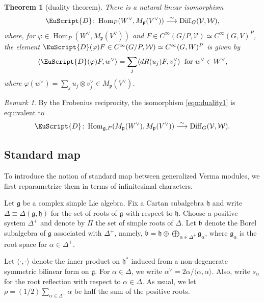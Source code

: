 \documentclass[reqno,11pt]{amsart}
\newtheorem{thm}[equation]{Theorem}
\theoremstyle{remark}
\newtheorem{rem}[equation]{Remark}
\numberwithin{equation}{section}
\newcommand{\ga}{\alpha}
\newcommand{\gD}{\Delta}
\newcommand{\fb}{{\mathfrak b}}
\newcommand{\fg}{{\mathfrak g}}
\newcommand{\fh}{{\mathfrak h}}
\newcommand{\fp}{{\mathfrak p}}
\newcommand{\Cal}{\mathcal}
\newcommand{\Hom}{\operatorname{Hom}}
\newcommand{\IP}[2]{\langle#1 , #2\rangle}     %
\newcommand{\To}{\longrightarrow}
\begin{document}
\begin{thm}[duality theorem]\label{thm:duality}
There is a natural linear isomorphism
\begin{equation}\label{eqn:duality1}
\EuScript{D}
\colon
\operatorname{Hom}_{P}(W^\vee,M_{\fp}(V^\vee))
\stackrel{\sim}{\To} 
\operatorname{Diff}_{G}(\mathcal V, \mathcal W),
\end{equation}
where,
for $\varphi \in \Hom_P(W^\vee, M_\fp(V^\vee))$ and
$F \in C^\infty(G/P,\Cal{V})\simeq C^\infty(G,V)^P$,
the element $\EuScript{D}(\varphi)F \in C^\infty(G/P,\Cal{W})\simeq C^\infty(G,W)^P$
is given by 
\begin{equation}\label{eqn:HD}
\IP{\EuScript{D}(\varphi)F}{w^\vee} =
\sum_{j}\IP{dR(u_j)F}{v_j^\vee}
\;\; \text{for $w^\vee \in W^\vee$},
\end{equation}
where $\varphi(w^\vee)=\sum_j u_j\otimes v_j^\vee \in 
M_\fp(V^\vee)$.
\end{thm}

\begin{rem}
By the Frobenius reciprocity, the isomorphism \eqref{eqn:duality1} is equivalent to
\begin{equation}\label{eqn:duality2}
\EuScript{D}
\colon
\operatorname{Hom}_{\fg, P}(M_\fp(W^\vee),M_{\fp}(V^\vee))
\stackrel{\sim}{\To} 
\operatorname{Diff}_{G}(\mathcal V, \mathcal W).
\end{equation}

\end{rem}

\subsection{Standard map}\label{sec:Std1}
To introduce the notion of standard map between
generalized Verma modules, we first reparametrize
them in terms of infinitesimal characters.

Let $\fg$ be a complex simple Lie algebra. Fix a Cartan subalgebra $\fh$ and 
write $\gD\equiv \gD(\fg, \fh)$ for the set of roots of $\fg$ with respect to $\fh$.
Choose a positive system $\gD^+$ and denote by $\Pi$ the set of simple roots of 
$\gD$. Let $\fb$ denote the Borel subalgebra of $\fg$ associated with $\gD^+$, namely,
$\fb = \fh \oplus \bigoplus_{\ga \in \gD^+} \fg_\ga$, where $\fg_\ga$ is the root space
for $\ga \in \gD^+$.

Let $\IP{\cdot}{\cdot}$ denote the inner product on $\fh^*$ induced from 
a non-degenerate symmetric bilinear form 
on $\fg$. For $\ga \in \gD$, we write $\ga^\vee = 2\ga/\IP{\ga}{\ga}$. Also, write 
$s_\ga$ for the root reflection with respect to $\ga \in \gD$. As usual, we let 
$\rho=(1/2)\sum_{\ga \in \gD^+}\ga$ be half the sum of the positive roots.
\end{document}
